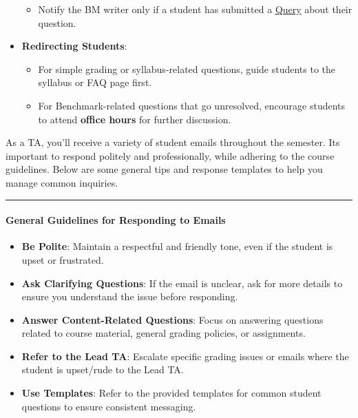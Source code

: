 \documentclass[
]{article}
\providecommand{\tightlist}{%
  \setlength{\itemsep}{0pt}\setlength{\parskip}{0pt}}
\begin{document}
\begin{itemize}
  \begin{itemize}
  \tightlist
  \item
    Notify the BM writer only if a student has submitted a \protect\hyperlink{benchmark-queries}{Query} about their question.
  \end{itemize}
\item
  \textbf{Redirecting Students}:

  \begin{itemize}
  \tightlist
  \item
    For simple grading or syllabus-related questions, guide students to the syllabus or FAQ page first.
  \item
    For Benchmark-related questions that go unresolved, encourage students to attend \textbf{office hours} for further discussion.
  \end{itemize}
\end{itemize}

As a TA, you'll receive a variety of student emails throughout the semester. Its important to respond politely and professionally, while adhering to the course guidelines. Below are some general tips and response templates to help you manage common inquiries.

\begin{center}\rule{0.5\linewidth}{0.5pt}\end{center}

\hypertarget{general-guidelines-for-responding-to-emails}{%
\paragraph{General Guidelines for Responding to Emails}\label{general-guidelines-for-responding-to-emails}}

\begin{itemize}
\tightlist
\item
  \textbf{Be Polite}: Maintain a respectful and friendly tone, even if the student is upset or frustrated.
\item
  \textbf{Ask Clarifying Questions}: If the email is unclear, ask for more details to ensure you understand the issue before responding.
\item
  \textbf{Answer Content-Related Questions}: Focus on answering questions related to course material, general grading policies, or assignments.
\item
  \textbf{Refer to the Lead TA}: Escalate specific grading issues or emails where the student is upset/rude to the Lead TA.
\item
  \textbf{Use Templates}: Refer to the provided templates for common student questions to ensure consistent messaging.
\end{itemize}
\end{document}
